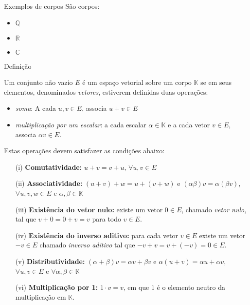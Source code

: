 \documentclass{beamer}
\begin{document}
\begin{darkframes}
\begin{frame}{Exemplos de corpos}
  São corpos: 
  \begin{itemize}
      \item ${\mathbb{Q}}$
      \item ${\mathbb{R}}$
      \item ${\mathbb{C}}$
  \end{itemize} 
\end{frame}

\begin{frame}{}
\begin{block}{Definição}
{\footnotesize{%
  Um conjunto não vazio $E$ é um \alert{espaço vetorial} sobre um corpo ${\mathbb{K}}$ se em seus elementos, denominados \emph{vetores}, estiverem definidas duas operações: 
  \begin{itemize}
    \setlength\itemsep{0em}
  \item \emph{soma}: A cada $u,v \in E$, associa $u+v \in E$
  \item \emph{multiplicação por um escalar}: a cada escalar $\alpha \in {\mathbb{K}}$ e a cada vetor $v \in E$, associa $\alpha v \in E$.
  \end{itemize}
  Estas operações devem satisfazer as condições abaixo:
  \begin{itemize}
    \setlength\itemsep{0em}
  \item[(i)] {\bf{Comutatividade:}} $u+v = v+u$, $\forall u, v \in E$
  \item[(ii)] {\bf{Associatividade:}} $(u+v)+w = u+(v+w)$ e $(\alpha \beta)v = \alpha (\beta v)$, $\forall u, v, w\in E$ e $\alpha, \beta \in {\mathbb{K}}$
  \item[(iii)] {\bf{Existência do vetor nulo:}} existe um vetor $0\in E$, chamado \emph{vetor nulo}, tal que $v+0 = 0+v = v$ para todo $v\in E$.
  \item[(iv)] {\bf{Existência do inverso aditivo:}} para cada vetor $v\in E$ existe um vetor $-v \in E$ chamado \emph{inverso aditivo} tal que $-v+v = v+(-v) = 0\in E$.
  \item[(v)] {\bf{Distributividade:}} $(\alpha + \beta)v = \alpha v + \beta v$ e $\alpha(u+v) = \alpha u + \alpha v$, $\forall u, v \in E$ e $\forall \alpha, \beta \in {\mathbb{K}}$
  \item[(vi)] {\bf{Multiplicação por 1:}} $1\cdot v = v$, em que $1$ é o elemento neutro da multiplicação em ${\mathbb{K}}$.
  \end{itemize}
  }}
\end{block}
\end{frame}


\end{darkframes}
\end{document}
